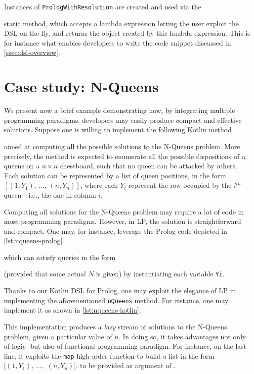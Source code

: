 \documentclass[12pt,a4paper,openright,twoside]{book}
\begin{document}
%
Instances of \texttt{Pro\-logWi\-thRe\-so\-lu\-tion} are created and used via the
%
\begin{center}
\end{center}
%
static method, which accepts a lambda expression letting the user exploit the DSL on the fly, and returns the object created by this lambda expression.
%
This is for instance what enables developers to write the code snippet discussed in \cref{ssec:dsl-overview}.

\section{Case study: N-Queens}\label{sec:case-study}

We present now a brief example demonstrating how, by integrating multiple programming paradigms, developers may easily produce compact and effective solutions.
%
Suppose one is willing to implement the following Kotlin method
%
\begin{center}
\end{center}
%
aimed at computing all the possible solutions to the N-Queens problem.
%
More precisely, the method is expected to enumerate all the possible dispositions of $n$ queens on a $n \times n$ chessboard, such that no queen can be attacked by others.
%
Each solution can be represented by a list of queen positions, in the form $[(1, Y_1),\ \ldots,\ (n, Y_n)]$, where each $Y_i$ represent the row occupied by the $i^{th}$ queen---i.e., the one in column $i$.

Computing all solutions for the N-Queens problem may require a lot of code in most programming paradigms.
%
However, in LP, the solution is straightforward and compact.
%
One may, for instance, leverage the Prolog code depicted in \cref{lst:nqueens-prolog}.
%

%
which can satisfy queries in the form
%
\begin{center}
\end{center}
%
(provided that some actual $N$ is given) by instantiating each variable \texttt{Yi}.

Thanks to our Kotlin DSL for Prolog, one may exploit the elegance of LP in implementing the aforementioned \texttt{nQueens} method.
%
For instance, one may implement it as shown in \cref{lst:nqueens-kotlin}.
%

%
This implementation produces a \emph{lazy} stream of solutions to the N-Queens problem, given a particular value of $n$.
%
In doing so, it takes advantages not only of logic- but also of functional-programming paradigm.
%
For instance, on the last line, it exploits the \texttt{map} high-order function to build a list in the form $[(1, Y_1),\ \ldots,$ $(n, Y_n)]$, to be provided as argument of .
\end{document}
